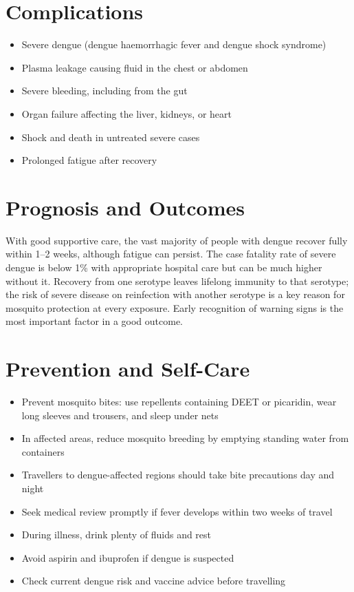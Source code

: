 \section*{Complications}
\begin{itemize}
    \item Severe dengue (dengue haemorrhagic fever and dengue shock syndrome)
    \item Plasma leakage causing fluid in the chest or abdomen
    \item Severe bleeding, including from the gut
    \item Organ failure affecting the liver, kidneys, or heart
    \item Shock and death in untreated severe cases
    \item Prolonged fatigue after recovery
\end{itemize}

\section*{Prognosis and Outcomes}
With good supportive care, the vast majority of people with dengue recover fully within 1--2 weeks, although fatigue can persist. The case fatality rate of severe dengue is below 1\% with appropriate hospital care but can be much higher without it. Recovery from one serotype leaves lifelong immunity to that serotype; the risk of severe disease on reinfection with another serotype is a key reason for mosquito protection at every exposure. Early recognition of warning signs is the most important factor in a good outcome.

\section*{Prevention and Self-Care}
\begin{itemize}
    \item Prevent mosquito bites: use repellents containing DEET or picaridin, wear long sleeves and trousers, and sleep under nets
    \item In affected areas, reduce mosquito breeding by emptying standing water from containers
    \item Travellers to dengue-affected regions should take bite precautions day and night
    \item Seek medical review promptly if fever develops within two weeks of travel
    \item During illness, drink plenty of fluids and rest
    \item Avoid aspirin and ibuprofen if dengue is suspected
    \item Check current dengue risk and vaccine advice before travelling
\end{itemize}

